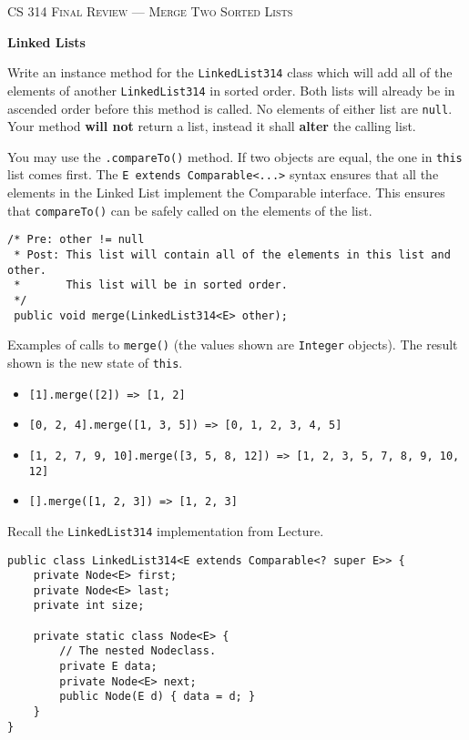 \documentclass[12pt,letter]{article}
\begin{document}
\noindent\textsc{\large CS 314 Final Review --- Merge Two Sorted Lists}

\vspace{6pt}
\noindent\textbf{Linked Lists}

\vspace{2pt}
\noindent Write an instance method for the \texttt{LinkedList314} class which will add all of the elements of another \texttt{LinkedList314} in sorted order.
Both lists will already be in ascended order before this method is called. No elements of either list are \texttt{null}. 
Your method \textbf{will not} return a list, instead it shall \textbf{alter} the calling list.

\vspace{4pt}
\noindent You may use the \texttt{.compareTo()} method. If two objects are equal, the one in \texttt{this} list comes first.
The \texttt{E extends Comparable<...>} syntax ensures that all the elements in the Linked List implement the Comparable interface.
This ensures that \texttt{compareTo()} can be safely called on the elements of the list.

\begin{verbatim}
/* Pre: other != null
 * Post: This list will contain all of the elements in this list and other.
 *       This list will be in sorted order.
 */
 public void merge(LinkedList314<E> other);
\end{verbatim}

\noindent Examples of calls to \texttt{merge()} (the values shown are \texttt{Integer} objects). The result shown is the new state of \texttt{this}.
\begin{itemize}
  \item \texttt{[1].merge([2]) => [1, 2]}
  \item \texttt{[0, 2, 4].merge([1, 3, 5]) => [0, 1, 2, 3, 4, 5]}
  \item \begin{verbatim}[1, 2, 7, 9, 10].merge([3, 5, 8, 12]) => [1, 2, 3, 5, 7, 8, 9, 10, 12] \end{verbatim}
  \item \texttt{[].merge([1, 2, 3]) => [1, 2, 3]}
\end{itemize}

\vspace{6pt}
\noindent Recall the \texttt{LinkedList314} implementation from Lecture.
\begin{verbatim}
public class LinkedList314<E extends Comparable<? super E>> {
    private Node<E> first;
    private Node<E> last;
    private int size;

    private static class Node<E> {
        // The nested Nodeclass.
        private E data;
        private Node<E> next;
        public Node(E d) { data = d; }
    }
}
\end{verbatim}
\end{document}
